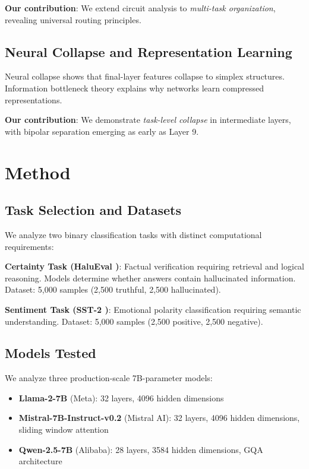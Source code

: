 \documentclass{article}
\begin{document}
\textbf{Our contribution}: We extend circuit analysis to \textit{multi-task organization}, revealing universal routing principles.

\subsection{Neural Collapse and Representation Learning}

Neural collapse \cite{papyan2020prevalence} shows that final-layer features collapse to simplex structures. Information bottleneck theory \cite{tishby2015deep} explains why networks learn compressed representations.

\textbf{Our contribution}: We demonstrate \textit{task-level collapse} in intermediate layers, with bipolar separation emerging as early as Layer 9.

\section{Method}

\subsection{Task Selection and Datasets}

We analyze two binary classification tasks with distinct computational requirements:

\textbf{Certainty Task (HaluEval \cite{li2023halueval})}: Factual verification requiring retrieval and logical reasoning. Models determine whether answers contain hallucinated information. Dataset: 5,000 samples (2,500 truthful, 2,500 hallucinated).

\textbf{Sentiment Task (SST-2 \cite{socher2013recursive})}: Emotional polarity classification requiring semantic understanding. Dataset: 5,000 samples (2,500 positive, 2,500 negative).

\subsection{Models Tested}

We analyze three production-scale 7B-parameter models:

\begin{itemize}
    \item \textbf{Llama-2-7B} (Meta): 32 layers, 4096 hidden dimensions
    \item \textbf{Mistral-7B-Instruct-v0.2} (Mistral AI): 32 layers, 4096 hidden dimensions, sliding window attention
    \item \textbf{Qwen-2.5-7B} (Alibaba): 28 layers, 3584 hidden dimensions, GQA architecture
\end{itemize}
\end{document}

